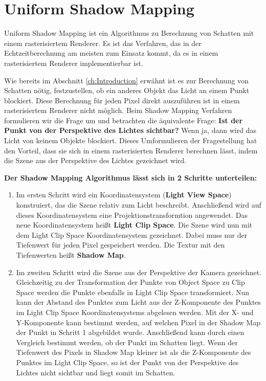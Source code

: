 \section{Uniform Shadow Mapping}
\label{section:uniform-shadow-mapping}
Uniform Shadow Mapping \cite{Williams1978} ist ein Algorithmus zu Berechnung von Schatten 
mit einem rasterisiertem Renderer. 
Es ist das Verfahren, das in der Echtzeitberechnung am meisten zum Einsatz kommt, 
da es in einem rasterisiertem Renderer implementierbar ist.
\par
Wie bereits im Abschnitt \ref{ch:Introduction} erwähnt ist es zur Berechnung von Schatten nötig, festzustellen,
ob ein anderes Objekt das Licht an einem Punkt blockiert.
Diese Berechnung für jeden Pixel direkt auszuführen ist in einem rasterisiertem 
Renderer nicht möglich.
Beim Shadow Mapping Verfahren formulieren wir die Frage um und betrachten 
die äquivalente Frage:
\textbf{Ist der Punkt von der Perspektive des Lichtes sichtbar?}
Wenn ja, dann wird das Licht von keinem Objekte blockiert.
Dieses Umformulieren der Fragestellung hat den Vorteil, dass sie sich in
einem rasterisierten Renderer berechnen lässt, indem die Szene aus der Perspektive des Lichtes gezeichnet wird.
\par
\textbf{Der Shadow Mapping Algorithmus lässt sich in 2 Schritte 
unterteilen:}
\begin{enumerate}
  \item Im ersten Schritt wird ein Koordinatensystem (\textbf{Light View Space}) konstruiert, 
    das die Szene relativ zum Licht beschreibt.
    Anschließend wird auf dieses Koordinatensystem eine Projektionstransformtion angewendet.
    Das neue Koordinatensystem heißt \textbf{Light Clip Space}.
    Die Szene wird nun mit dem Light Clip Space Koordinatensystem gezeichnet.
    Dabei muss nur der Tiefenwert für jeden Pixel gespeichert werden.
    Die Textur mit den Tiefenwerten heißt \textbf{Shadow Map}.
  \item Im zweiten Schritt wird die Szene aus der Perspektive der Kamera gezeichnet.
    Gleichzeitig zu der Transformation der Punkte von Object Space zu Clip Space
    werden die Punkte ebenfalls in Light Clip Space transformiert.
    Nun kann der Abstand des Punktes zum Licht 
    aus der Z-Komponente des Punktes im Light Clip Space Koordinatensystems abgelesen werden.
    Mit der X- und Y-Komponente kann bestimmt werden, auf welchen Pixel in der Shadow Map der Punkt in Schritt 1 abgebildet wurde.
    Anschließend kann durch einen Vergleich bestimmt werden, ob der Punkt im Schatten liegt.
    Wenn der Tiefenwert des Pixels in Shadow Map kleiner ist als die Z-Komponente des Punktes im Light Clip Space,
    so ist der Punkt von der Perspektive des Lichtes nicht sichtbar und liegt somit im Schatten.
\end{enumerate}

